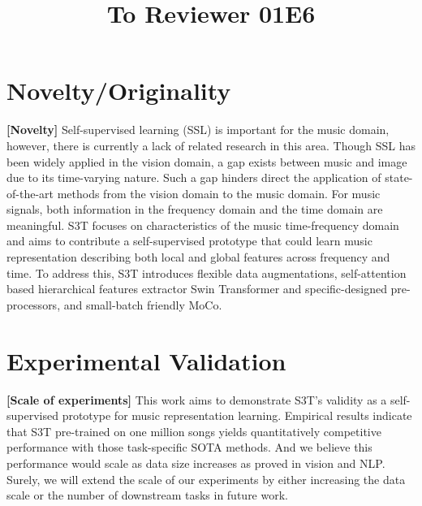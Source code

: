 \documentclass{article}
\title{To Reviewer 01E6}
\begin{document}
\maketitle

\section{Novelty/Originality}
\textbf{[Novelty]}
Self-supervised learning (SSL) is important for the music domain, however, there is currently a lack of related research in this area. Though SSL has been widely applied in the vision domain, a gap exists between music and image due to its time-varying nature. Such a gap hinders direct the application of state-of-the-art methods from the vision domain to the music domain. For music signals, both information in the frequency domain and the time domain are meaningful. S3T focuses on characteristics of the music time-frequency domain and aims to contribute a self-supervised prototype that could learn music representation describing both local and global features across frequency and time. To address this, S3T introduces flexible data augmentations, self-attention based hierarchical features extractor Swin Transformer and specific-designed pre-processors, and small-batch friendly MoCo.


\section{Experimental Validation}

\textbf{[Scale of experiments]} This work aims to demonstrate S3T's validity as a self-supervised prototype for music representation learning. Empirical results indicate that S3T pre-trained on one million songs yields quantitatively competitive performance with those task-specific SOTA methods. And we believe this performance would scale as data size increases as proved in vision and NLP. Surely, we will extend the scale of our experiments by either increasing the data scale or the number of downstream tasks in future work. 
\\
\end{document}
